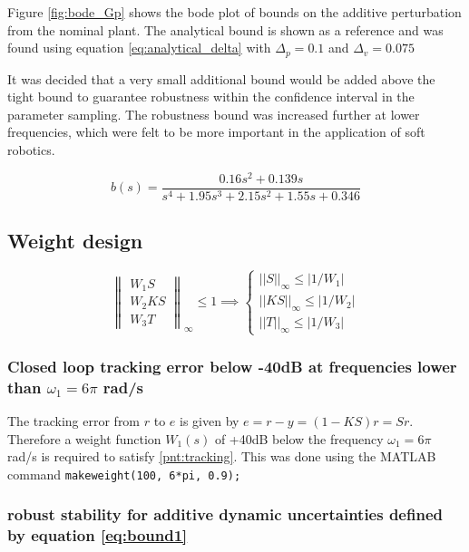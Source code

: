 \documentclass{article}
\begin{document}
Figure \ref{fig:bode_Gp} shows the bode plot of bounds on the additive perturbation from the nominal plant.
The analytical bound is shown as a reference and was found using equation \ref{eq:analytical_delta} with $\Delta_p = 0.1$ and $\Delta_v = 0.075$

It was decided that a very small additional bound would be added above the tight bound to guarantee robustness within the confidence interval in the parameter sampling.
The robustness bound was increased further at lower frequencies, which were felt to be more important in the application of soft robotics.

\begin{equation}
    b(s) = \frac{0.16s^2 + 0.139s}{s^4 + 1.95s^3 + 2.15s^2 + 1.55s + 0.346}
    \label{eq:bound1}
\end{equation}

\subsection{Weight design}

\begin{equation}
    \begin{Vmatrix}
        W_1 S \\
        W_2 KS \\
        W_3 T
    \end{Vmatrix}_\infty \le 1 \implies
    \begin{cases}
        ||S||_\infty \le |1/W_1| \\
        ||KS||_\infty \le |1/W_2| \\
        ||T||_\infty \le |1/W_3|
    \end{cases}
\end{equation}

\subsubsection{Closed loop tracking error below -40dB at frequencies lower than $\omega_1=6\pi$ rad/s \label{pnt:tracking}}

The tracking error from $r$ to $e$ is given by $e = r - y = (1 - KS)r = Sr$. Therefore a weight function $W_1(s)$ of +40dB below the frequency $\omega_1 = 6\pi$ rad/s is required to satisfy \ref{pnt:tracking}.
This was done using the MATLAB command \texttt{makeweight(100, 6*pi, 0.9);}

\subsubsection{robust stability for additive dynamic uncertainties defined by equation \ref{eq:bound1} \label{pnt:robust}}
\end{document}
